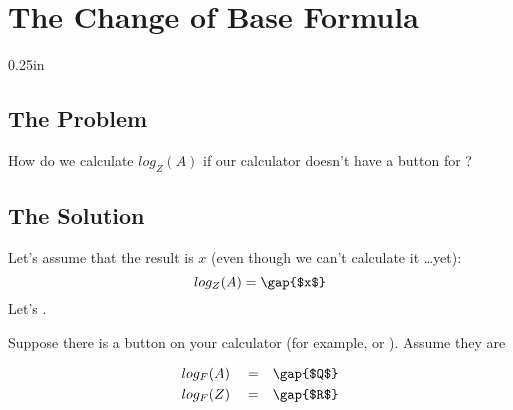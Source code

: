 \section{The Change of Base Formula}
\begin{NoHyper} %

{0.25in}


\subsection{The Problem}

How do we calculate $ log_Z(A) $ 
if our calculator doesn't have a button for ?

\subsection{The Solution}

Let's assume that the result is $x$ (even though we can't calculate it \dots yet):
\begin{equation} log_Z(A) = \text{\gap{$x$}} \label{eq:x}\end{equation}
Let's   .

Suppose there is a  button on your calculator
(for example,  or ). 
Assume they are 

\begin{alignat}{3}
    &log_F(A) &&= && \text{\gap{$Q$}} \label{eq:Q}\\
    &log_F(Z) &&= && \text{\gap{$R$}} \label{eq:R}
\end{alignat}


\end{NoHyper}
